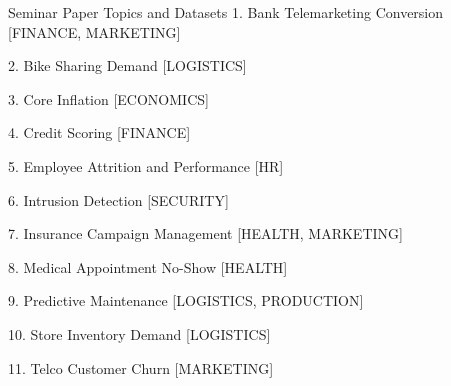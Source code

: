 \documentclass[document.tex]{subfiles}
\begin{document}
    \begin{frame}{Seminar Paper Topics and Datasets}
        1. Bank Telemarketing Conversion [FINANCE, MARKETING] 
        
        2. Bike Sharing Demand [LOGISTICS]
        
        3. Core Inflation [ECONOMICS]
        
        4. Credit Scoring [FINANCE]
        
        5. Employee Attrition and Performance [HR] 
        
        6. Intrusion Detection [SECURITY]
        
        7. Insurance Campaign Management [HEALTH, MARKETING] 
        
        8. Medical Appointment No-Show [HEALTH]
        
        9. Predictive Maintenance [LOGISTICS, PRODUCTION]
        
        10. Store Inventory Demand [LOGISTICS] 
        
        11. Telco Customer Churn [MARKETING]
    \end{frame}
    \fi
\end{document}
